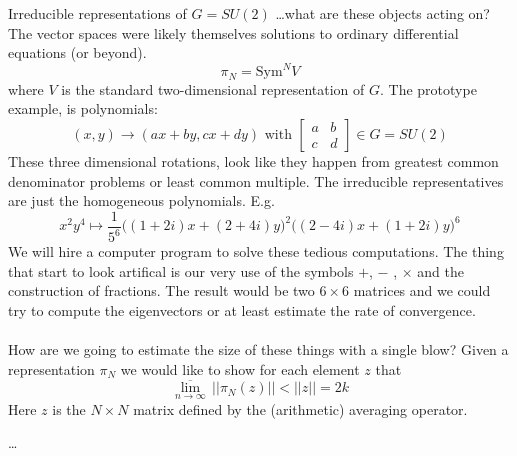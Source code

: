 \documentclass[12pt]{article}
\begin{document}
\newpage

\noindent  Irreducible representations of $G = SU(2)$ \dots what are these objects acting on?  The vector spaces were likely themselves solutions to ordinary differential equations (or beyond).  
$$ \pi_N = \text{Sym}^N V $$
where $V$ is the standard two-dimensional representation of $G$. The prototype example, is polynomials:
$$ (x,y) \to (ax +by, cx + dy) \text{ with }\left[ \begin{array}{cc} a & b \\ c & d \end{array}\right] \in 
G = SU(2)$$ 
These three dimensional rotations, look like they happen from greatest common denominator problems or least common multiple.  The irreducible representatives are just the homogeneous polynomials.  E.g.
$$ x^2 y^4 \mapsto \frac{1}{5^6}\big((1+2i)x + (2+4i) y\big)^2 \big((2-4i)x + (1+2i)y\big)^6 $$
We will hire a computer program to solve these tedious computations.  The thing that start to look artifical is our very use of the symbols $+$, $-$ , $\times$ and the construction of fractions.  The result would be two $6 \times 6$ matrices and we could try to compute the eigenvectors or at least estimate the rate of convergence. 
\\ \\
How are we going to estimate the size of these things with a single blow?  Given a representation $\pi_N$ we would like to show for each element $z$ that 
$$ \overline{\lim_{n \to \infty}} \, ||\pi_N(z)|| < ||z|| = 2k $$
Here $z$ is the $N \times N$ matrix defined by the (arithmetic) averaging operator.  

\vfill



\begin{thebibliography}{}

\item \dots 

\end{thebibliography}
\end{document}

